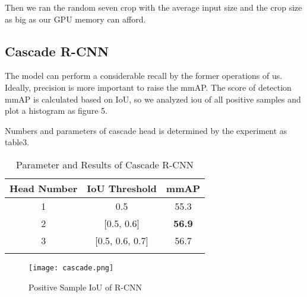 \documentclass{article}
\begin{document}
\par Then we ran the random seven crop with the average input size and the crop size as big as our GPU memory can afford.
\subsection{Cascade R-CNN}
The model can perform a considerable recall by the former operations of us. Ideally, precision is more important to raise the mmAP. The score of detection mmAP is calculated based on IoU, so we analyzed iou of all positive samples and plot a histogram as figure 5. 
\par Numbers and parameters of cascade head is determined by the experiment as table3.
\begin{table}[htb]
    \centering
    \begin{tabular}{ccc}
    \hline
         Head Number& IoU Threshold& mmAP \\
    \hline
         1 & 0.5 & 55.3 \\
         2 & [0.5, 0.6] &\textbf{56.9}\\
         3 &[0.5, 0.6, 0.7] & 56.7\\
    \hline
    \\
    \end{tabular}
    \caption{Parameter and Results of Cascade R-CNN}
    \label{tab:my_label}
\end{table}
\begin{figure}[htb]
    \centering
    \texttt{[image: cascade.png]}
    \caption{Positive Sample IoU of R-CNN}
    \label{fig:my_label}
\end{figure}
\end{document}
